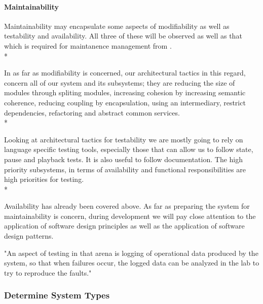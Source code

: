 \documentclass[11pt]{article}
\begin{document}

\paragraph{Maintainability}

Maintainability may encapsulate some aspects of modifiability as well as testability and availability. All three of these will be observed as well as that which is required for maintanence management from \cite{Book:1}. \\*

In as far as modifiability is concerned, our architectural tactics in this regard, concern all of our system and its subsystems; they are reducing the size of modules through spliting modules, increasing cohesion by increasing semantic coherence, reducing coupling by encapsulation, using an intermediary, restrict dependencies, refactoring and abstract common services. \\*

Looking at architectural tactics for testability we are mostly going to rely on language specific testing tools, especially those that can allow us to follow state, pause and playback tests. It is also useful to follow documentation. The high priority subsystems, in terms of availability and functional responsibilities are high priorities for testing. \\*

Availability has already been covered above. As far as preparing the system for maintainability is concern, during development we will pay close attention to the application of software design principles as well as the application of software design patterns.

"An aspect of testing in that arena is logging of operational data produced by the system, so that when failures occur, the logged data can be analyzed in the lab to try to reproduce the faults."\cite{Book:2}

\subsubsection{Determine System Types}
\end{document}
